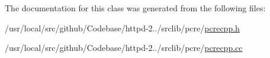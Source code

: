The documentation for this class was generated from the following files\+:\begin{DoxyCompactItemize}
\item 
/usr/local/src/github/\+Codebase/httpd-\/2../srclib/pcre/\hyperlink{pcrecpp_8h}{pcrecpp.\+h}\item 
/usr/local/src/github/\+Codebase/httpd-\/2../srclib/pcre/\hyperlink{pcrecpp_8cc}{pcrecpp.\+cc}\end{DoxyCompactItemize}
